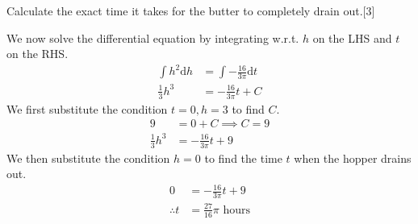 \documentclass[12pt, a4 paper]{article}
\begin{document}
\begin{outline}[enumerate]
 \2 Calculate the exact time it takes for the butter to completely drain out.\hfill[3]
 \begin{answer}
 We now solve the differential equation by integrating w.r.t. $h$ on the LHS and $t$ on the RHS.
   \begin{align*}
     \int {h^2}\mathrm{d}h &= \int - \frac{16}{3\pi} \mathrm{d}t \\
     \frac{1}{3}h^3 &= -\frac{16}{3\pi}t + C
   \end{align*}
   We first substitute the condition $t=0,h=3$ to find $C$.
   \begin{align*}
     9 &= 0 + C \implies C=9\\
     \frac{1}{3}h^3 &= -\frac{16}{3\pi}t + 9
   \end{align*}
   We then substitute the condition $h=0$ to find the time $t$ when the hopper drains out.
   \begin{align*}
     0 &= -\frac{16}{3\pi}t + 9 \\
     \therefore t&=\frac{27}{16}\pi \textrm{ hours}
   \end{align*}
 \end{answer}


\end{outline}
\end{document}
